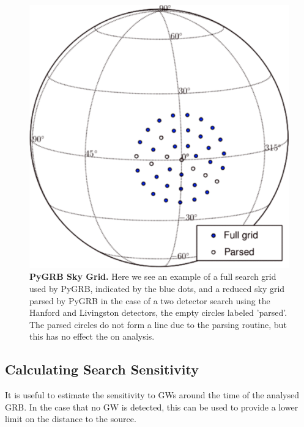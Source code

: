 \documentclass[11pt]{cuthesis}
\begin{document}
\begin{figure} %
\begin{center}
\includegraphics[width=0.6\linewidth]{skypatch.png}
\end{center}
\caption{\textbf{PyGRB Sky Grid.} Here we see an example of a full search grid used by PyGRB, indicated by the blue dots, and a reduced sky grid parsed by PyGRB in the case of a two detector search using the Hanford and Livingston detectors, the empty circles labeled 'parsed'. The parsed circles do not form a line due to the parsing routine, but this has no effect the on analysis.\cite{pygrb_Williamson:2014}}
\label{fig:skypatch}
\end{figure}

\subsection{Calculating Search Sensitivity} \label{sec:pygrb sensitivity}
It is useful to estimate the sensitivity to GWs around the time of the analysed GRB. In the case that no GW is detected, this can be used to provide a lower limit on the distance to the source.  
\end{document}
